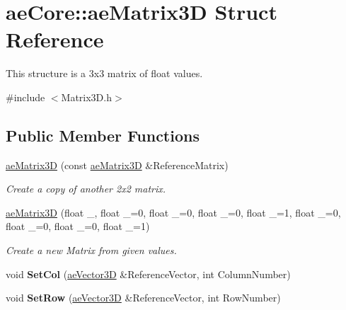 \hypertarget{structae_core_1_1ae_matrix3_d}{}\section{ae\+Core\+:\+:ae\+Matrix3D Struct Reference}
\label{structae_core_1_1ae_matrix3_d}


This structure is a 3x3 matrix of float values.  




{\ttfamily \#include $<$Matrix3\+D.\+h$>$}

\subsection*{Public Member Functions}
\begin{DoxyCompactItemize}
\item 
\hyperlink{structae_core_1_1ae_matrix3_d_a8dbe3b391388436c48622049083b2663}{ae\+Matrix3D} (const \hyperlink{structae_core_1_1ae_matrix3_d}{ae\+Matrix3D} \&Reference\+Matrix)\hypertarget{structae_core_1_1ae_matrix3_d_a8dbe3b391388436c48622049083b2663}{}\label{structae_core_1_1ae_matrix3_d_a8dbe3b391388436c48622049083b2663}

\begin{DoxyCompactList}\small\item\em Create a copy of another 2x2 matrix. \end{DoxyCompactList}\item 
\hyperlink{structae_core_1_1ae_matrix3_d_a76c50a3e7c353d3c60f9819adf3b3208}{ae\+Matrix3D} (float \+\_, float \+\_=0, float \+\_=0, float \+\_=0, float \+\_=1, float \+\_=0, float \+\_=0, float \+\_=0, float \+\_=1)\hypertarget{structae_core_1_1ae_matrix3_d_a76c50a3e7c353d3c60f9819adf3b3208}{}\label{structae_core_1_1ae_matrix3_d_a76c50a3e7c353d3c60f9819adf3b3208}

\begin{DoxyCompactList}\small\item\em Create a new Matrix from given values. \end{DoxyCompactList}\item 
void {\bfseries Set\+Col} (\hyperlink{structae_core_1_1ae_vector3_d}{ae\+Vector3D} \&Reference\+Vector, int Column\+Number)\hypertarget{structae_core_1_1ae_matrix3_d_a69f36876c5776578f797d1fef6548816}{}\label{structae_core_1_1ae_matrix3_d_a69f36876c5776578f797d1fef6548816}

\item 
void {\bfseries Set\+Row} (\hyperlink{structae_core_1_1ae_vector3_d}{ae\+Vector3D} \&Reference\+Vector, int Row\+Number)\hypertarget{structae_core_1_1ae_matrix3_d_af496c78bfc927b83e3676512828914f9}{}\label{structae_core_1_1ae_matrix3_d_af496c78bfc927b83e3676512828914f9}


\end{DoxyCompactItemize}
